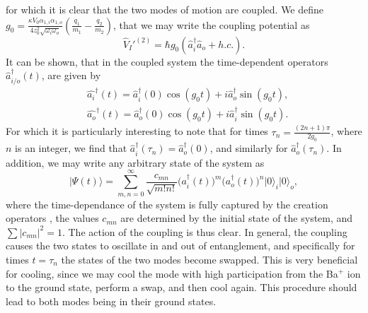 for which it is clear that the two modes of motion are coupled. We define $g_0 = \frac{\kappa V_0\alpha_{1,i}\alpha_{1,o}}{4z_0^2\sqrt{\omega_i\omega_o}}(\frac{q_1}{m_1}-\frac{q_2}{m_2})$, that we may write the coupling potential as 
\begin{equation}
    \hat{V}_I'^{(2)} = \hbar g_0(\hat{a}_i^\dagger \hat{a}_o + h.c.).
\end{equation}
It can be shown, that in the coupled system the time-dependent operators $\hat{a}_{i/o}^\dagger(t)$, are given by \cite{hou2022coherently}
\begin{align}
    &\hat{a_i}^\dagger(t) = \hat{a}_i^\dagger(0)\cos(g_0t) + i\hat{a}_o^\dagger\sin(g_0t),\\
    &\hat{a_o}^\dagger(t) = \hat{a}_o^\dagger(0)\cos(g_0t) + i\hat{a}_i^\dagger\sin(g_0t).
\end{align}
For which it is particularly interesting to note that for times $\tau_n = \frac{(2n+1)\pi}{2g_0}$, where $n$ is an integer, we find that $\hat{a}_i^\dagger(\tau_n) = \hat{a}_o^\dagger(0)$, and similarly for $\hat{a}_o^\dagger(\tau_n)$. In addition, we may write any arbitrary state of the system as
\begin{equation}
    \vert \Psi(t)\rangle = \sum_{m,n = 0}^\infty \frac{c_{mn}}{\sqrt{m!n!}}\big(a_i^\dagger(t)\big)^m\big(a_o^\dagger(t)\big)^n\vert 0\rangle_i\vert 0\rangle_o,
\end{equation}
where the time-dependance of the system is fully captured by the creation operators \cite{hou2022coherently}, the values $c_{mn}$ are determined by the initial state of the system, and $\sum \vert c_{mn}\vert^2 =1$.
The action of the coupling is thus clear. In general, the coupling causes the two states to oscillate in and out of entanglement, and specifically for times $t = \tau_n$ the states of the two modes become swapped.
This is very beneficial for cooling, since we may cool the mode with high participation from the Ba$^+$ ion to the ground state, perform a swap, and then cool again. This procedure should lead to both modes being in their ground states.


